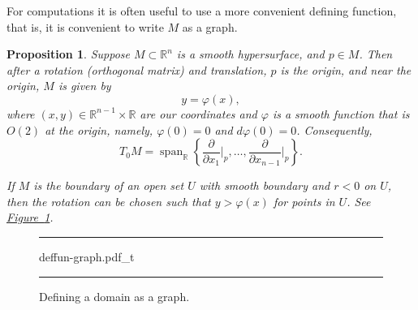 \documentclass[12pt,openany]{book}
\newcommand{\R}{{\mathbb{R}}}
\theoremstyle{plain}
\newtheorem{prop}[thm]{Proposition}
\theoremstyle{remark}
\theoremstyle{definition}
\newenvironment{myfig}{%
\begin{figure}[h!t]
\noindent\rule{\textwidth}{0.5pt}\vspace{12pt}\par\centering}%
{\par\noindent\rule{\textwidth}{0.5pt}
\end{figure}}
\theoremstyle{exercise}
\theoremstyle{example}
\newcommand{\figureref}[1]{\hyperref[#1]{Figure~\ref*{#1}}}
\begin{document}
For computations it is often useful to use a more convenient
defining function, that is, it is convenient to write $M$ as a graph.

\begin{prop} \label{prop:realgraphcoords}
Suppose $M \subset \R^n$ is a smooth hypersurface,
and $p \in M$.  Then after a rotation (orthogonal matrix) and translation,
$p$ is the origin, and near the origin, $M$ is given by
\begin{equation*}
y = \varphi(x) ,
\end{equation*}
where $(x,y) \in \R^{n-1} \times \R$ are our coordinates and
$\varphi$ is a smooth
function that is $O(2)$ at the origin,
namely, $\varphi(0) = 0$ and $d\varphi(0) = 0$.
Consequently,
\begin{equation*}
T_0M = \operatorname{span}_{\R} \left\{
\frac{\partial}{\partial x_1}\Big|_p,
\ldots,
\frac{\partial}{\partial x_{n-1}}\Big|_p \right\} .
\end{equation*}

\nopagebreak
If $M$ is the boundary of an open set $U$ with smooth boundary and
$r < 0$ on $U$,
then the rotation can be chosen
such that $y > \varphi(x)$ for points in $U$.
See \figureref{fig:deffun-graph}.
\end{prop}

\begin{myfig}
{deffun-graph.pdf_t}
\caption{Defining a domain as a graph.\label{fig:deffun-graph}}
\end{myfig}
\end{document}
